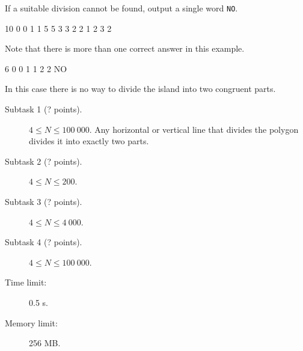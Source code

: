 \documentclass{boi2014}
\newcommand{\constant}[1]{{\tt #1}}
\begin{document}
	If a suitable division cannot be found, output a single word
	\constant{NO}.

    \clearpage

    \Examples
	\example
	{
		10  0  0  1  1  5  5  3  3  2  2
	}
	{
		1 2 3 2
	}
	{
        Note that there is more than one correct answer in this example.

        \begin{center}
        \end{center}
    }

    \example
    {
        6  0  0  1  1  2  2
    }
    {
        NO
    }
    {
        In this case there is no way to divide the island into two congruent
        parts.
        \begin{center}
        \end{center}
    }

    \Scoring

    \begin{description}
        \item[Subtask 1 (? points).] $4 \le N \le 100\ 000$.
        Any horizontal or vertical line that divides the polygon divides it into
        exactly two parts.
        
        \item[Subtask 2 (? points).] $4 \le N \le 200$.
        \item[Subtask 3 (? points).] $4 \le N \le 4\ 000$.
        \item[Subtask 4 (? points).] $4 \le N \le 100\ 000$.
    \end{description}

    \Constraints

    \begin{description}
        \item[Time limit:] 0.5 s.
        \item[Memory limit:] 256 MB.
    \end{description}
\end{document}
